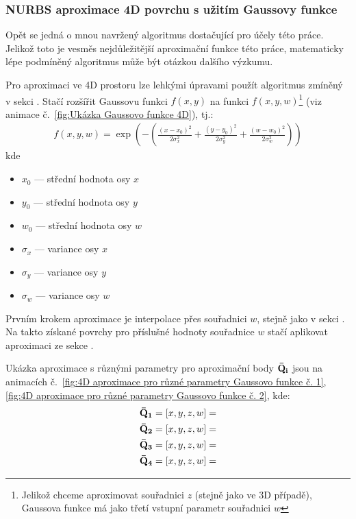 \subsubsection{NURBS aproximace 4D povrchu s užitím Gaussovy funkce}\label{section: gauss surface approximation 4D}
Opět se jedná o mnou navržený algoritmus dostačující pro účely této práce. Jelikož toto je vesměs nejdůležitější aproximační funkce této práce, matematicky lépe podmíněný algoritmus může být otázkou dalšího výzkumu.\par
Pro aproximaci ve 4D prostoru lze lehkými úpravami použít algoritmus zmíněný v
sekci . Stačí rozšířit
Gaussovu funkci $f(x,y)$ na funkci $f(x,y,w)$\footnote{Jelikož chceme
    aproximovat souřadnici $z$ (stejně jako ve 3D případě), Gaussova funkce má jako
    třetí vstupní parametr souřadnici $w$} (viz animace č.~\ref{fig:Ukázka Gaussovo
    funkce 4D}), tj.:
\begin{align}
    f(x,y,w) = \exp\left(-\left(\frac{(x - x_0)^2}{2\sigma_x^2} + \frac{(y - y_0)^2}{2\sigma_y^2} + \frac{(w - w_0)^2}{2\sigma_w^2} \right)\right)
\end{align}
kde
\begin{itemize}
    \item $x_0$ --- střední hodnota osy $x$
    \item $y_0$ --- střední hodnota osy $y$
    \item $w_0$ --- střední hodnota osy $w$
    \item $\sigma_x$ --- variance osy $x$
    \item $\sigma_y$ --- variance osy $y$
    \item $\sigma_w$ --- variance osy $w$
\end{itemize}
Prvním krokem aproximace je interpolace přes souřadnici $w$, stejně jako
v sekci . Na takto získané povrchy
pro příslušné hodnoty souřadnice $w$ stačí aplikovat aproximaci ze sekce .
\par
Ukázka aproximace s různými parametry pro aproximační body $\bf{\bar{Q}}_i$
jsou na animacích č.~\ref{fig:4D aproximace pro různé parametry Gaussovo funkce č. 1},
\ref{fig:4D aproximace pro různé parametry Gaussovo funkce č. 2}, kde:
\begin{align}
    \bf{\bar{Q}}_1 & = [x, y, z, w] =  \\
    \bf{\bar{Q}}_2 & = [x, y, z, w]=   \\
    \bf{\bar{Q}}_3 & = [x, y, z, w]=   \\
    \bf{\bar{Q}}_4 & = [x, y, z, w] = 
\end{align}
